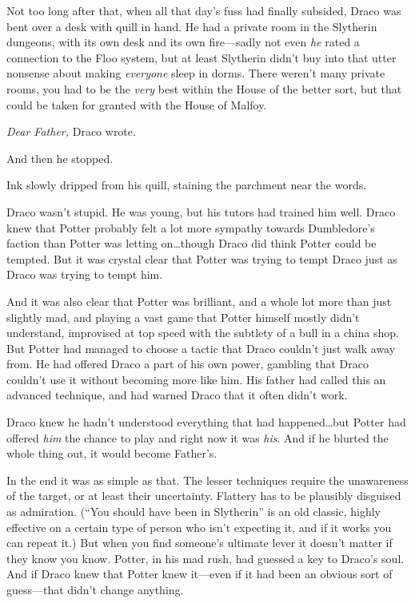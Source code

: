 
Not too long after that, when all that day’s fuss had finally subsided, Draco was bent over a desk with quill in hand. He had a private room in the Slytherin dungeons, with its own desk and its own fire—sadly not even \emph{he} rated a connection to the Floo system, but at least Slytherin didn’t buy into that utter nonsense about making \emph{everyone} sleep in dorms. There weren’t many private rooms, you had to be the \emph{very} best within the House of the better sort, but that could be taken for granted with the House of Malfoy.

\emph{Dear Father,} Draco wrote.

And then he stopped.

Ink slowly dripped from his quill, staining the parchment near the words.

Draco wasn’t stupid. He was young, but his tutors had trained him well. Draco knew that Potter probably felt a lot more sympathy towards Dumbledore’s faction than Potter was letting on…though Draco did think Potter could be tempted. But it was crystal clear that Potter was trying to tempt Draco just as Draco was trying to tempt him.

And it was also clear that Potter was brilliant, and a whole lot more than just slightly mad, and playing a vast game that Potter himself mostly didn’t understand, improvised at top speed with the subtlety of a bull in a china shop. But Potter had managed to choose a tactic that Draco couldn’t just walk away from. He had offered Draco a part of his own power, gambling that Draco couldn’t use it without becoming more like him. His father had called this an advanced technique, and had warned Draco that it often didn’t work.

Draco knew he hadn’t understood everything that had happened…but Potter had offered \emph{him} the chance to play and right now it was \emph{his}. And if he blurted the whole thing out, it would become Father’s.

In the end it was as simple as that. The lesser techniques require the unawareness of the target, or at least their uncertainty. Flattery has to be plausibly disguised as admiration. (“You should have been in Slytherin” is an old classic, highly effective on a certain type of person who isn’t expecting it, and if it works you can repeat it.) But when you find someone’s ultimate lever it doesn’t matter if they know you know. Potter, in his mad rush, had guessed a key to Draco’s soul. And if Draco knew that Potter knew it—even if it had been an obvious sort of guess—that didn’t change anything.

